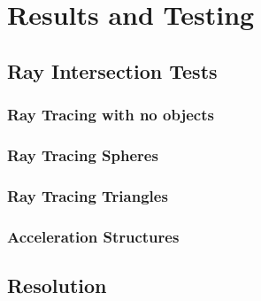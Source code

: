 \documentclass[final]{cmpreport}
\begin{document}
\section{Results and Testing}

\subsection{Ray Intersection Tests}

\subsubsection{Ray Tracing with no objects}

\subsubsection{Ray Tracing Spheres}

\subsubsection{Ray Tracing Triangles}

\subsubsection{Acceleration Structures}

\subsection{Resolution}

\end{document}
